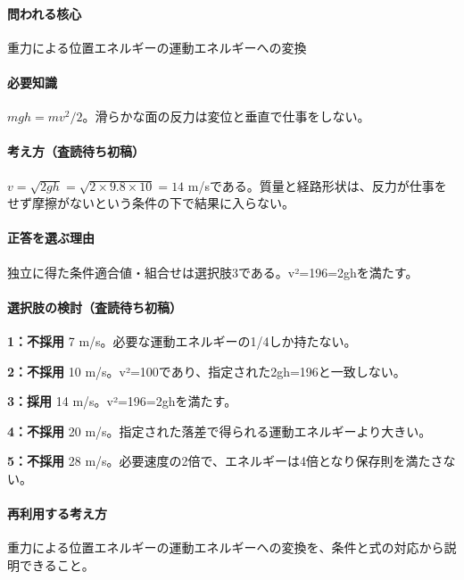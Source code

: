 \paragraph{問われる核心} 重力による位置エネルギーの運動エネルギーへの変換

\paragraph{必要知識} \(mgh=mv^2/2\)。滑らかな面の反力は変位と垂直で仕事をしない。

\paragraph{考え方（査読待ち初稿）} \(v=\sqrt{2gh}=\sqrt{2\times9.8\times10}=14\) m/sである。質量と経路形状は、反力が仕事をせず摩擦がないという条件の下で結果に入らない。

\paragraph{正答を選ぶ理由} 独立に得た条件適合値・組合せは選択肢3である。v²=196=2ghを満たす。

\paragraph{選択肢の検討（査読待ち初稿）}

\noindent\textbf{1：不採用} 7 m/s。必要な運動エネルギーの1/4しか持たない。\par

\noindent\textbf{2：不採用} 10 m/s。v²=100であり、指定された2gh=196と一致しない。\par

\noindent\textbf{3：採用} 14 m/s。v²=196=2ghを満たす。\par

\noindent\textbf{4：不採用} 20 m/s。指定された落差で得られる運動エネルギーより大きい。\par

\noindent\textbf{5：不採用} 28 m/s。必要速度の2倍で、エネルギーは4倍となり保存則を満たさない。\par

\paragraph{再利用する考え方} 重力による位置エネルギーの運動エネルギーへの変換を、条件と式の対応から説明できること。

